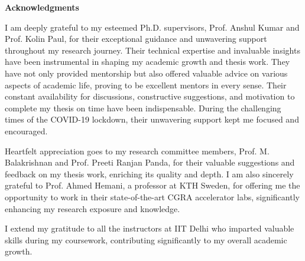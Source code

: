 

{}
\begin{center}
	{\Huge \textbf{Acknowledgments}} 
\end{center}


\vspace{0.30cm}

I am deeply grateful to my esteemed Ph.D. supervisors, Prof. Anshul Kumar and Prof. Kolin Paul, for their exceptional guidance and unwavering support throughout my research journey. Their technical expertise and invaluable insights have been instrumental in shaping my academic growth and thesis work. They have not only provided mentorship but also offered valuable advice on various aspects of academic life, proving to be excellent mentors in every sense. Their constant availability for discussions, constructive suggestions, and motivation to complete my thesis on time have been indispensable. During the challenging times of the COVID-19 lockdown, their unwavering support kept me focused and encouraged.

Heartfelt appreciation goes to my research committee members, Prof. M. Balakrishnan and Prof. Preeti Ranjan Panda, for their valuable suggestions and feedback on my thesis work, enriching its quality and depth. I am also sincerely grateful to Prof. Ahmed Hemani, a professor at KTH Sweden, for offering me the opportunity to work in their state-of-the-art CGRA accelerator labs, significantly enhancing my research exposure and knowledge.

I extend my gratitude to all the instructors at IIT Delhi who imparted valuable skills during my coursework, contributing significantly to my overall academic growth.

